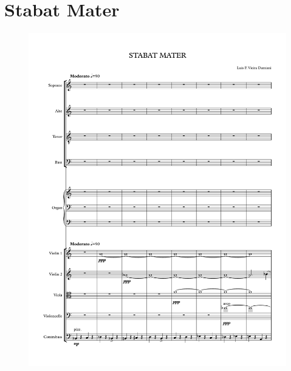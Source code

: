\chapter{Stabat Mater}

\begin{figure}[h!]
    \centering
	\includegraphics[width=6.5in]{figures/Stabat_Mater_1.pdf}
\end{figure}

